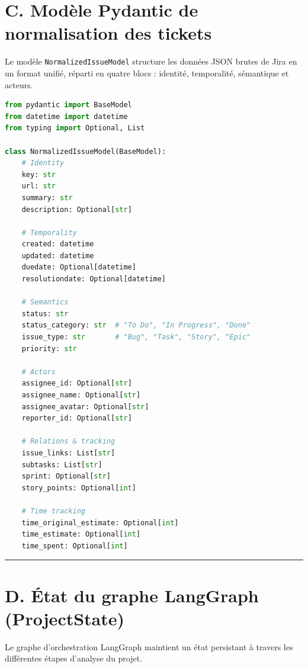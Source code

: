 \section*{C. Modèle Pydantic de normalisation des tickets}

Le modèle \texttt{NormalizedIssueModel} structure les données JSON brutes de Jira en un format unifié, réparti en quatre blocs : identité, temporalité, sémantique et acteurs.

\begin{lstlisting}[language=Python, caption={Modèle Pydantic de normalisation des tickets Jira}, label={lst:pydantic-model}]
from pydantic import BaseModel
from datetime import datetime
from typing import Optional, List

class NormalizedIssueModel(BaseModel):
    # Identity
    key: str
    url: str
    summary: str
    description: Optional[str]
    
    # Temporality
    created: datetime
    updated: datetime
    duedate: Optional[datetime]
    resolutiondate: Optional[datetime]
    
    # Semantics
    status: str
    status_category: str  # "To Do", "In Progress", "Done"
    issue_type: str       # "Bug", "Task", "Story", "Epic"
    priority: str
    
    # Actors
    assignee_id: Optional[str]
    assignee_name: Optional[str]
    assignee_avatar: Optional[str]
    reporter_id: Optional[str]
    
    # Relations & tracking
    issue_links: List[str]
    subtasks: List[str]
    sprint: Optional[str]
    story_points: Optional[int]
    
    # Time tracking
    time_original_estimate: Optional[int]
    time_estimate: Optional[int]
    time_spent: Optional[int]
\end{lstlisting}

\vspace{0.3cm}
\noindent\rule{\linewidth}{0.2pt}
\vspace{0.3cm}

\section*{D. État du graphe LangGraph (ProjectState)}

Le graphe d’orchestration LangGraph maintient un état persistant à travers les différentes étapes d’analyse du projet.

